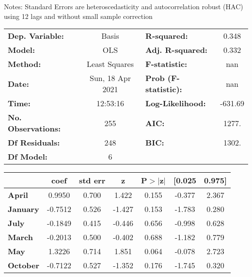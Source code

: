 Notes: \newline
 [1] Standard Errors are heteroscedasticity and autocorrelation robust (HAC) using 12 lags and without small sample correction
\begin{center}
\begin{tabular}{lclc}
\toprule
\textbf{Dep. Variable:}    &      Basis       & \textbf{  R-squared:         } &     0.348   \\
\textbf{Model:}            &       OLS        & \textbf{  Adj. R-squared:    } &     0.332   \\
\textbf{Method:}           &  Least Squares   & \textbf{  F-statistic:       } &       nan   \\
\textbf{Date:}             & Sun, 18 Apr 2021 & \textbf{  Prob (F-statistic):} &      nan    \\
\textbf{Time:}             &     12:53:16     & \textbf{  Log-Likelihood:    } &   -631.69   \\
\textbf{No. Observations:} &         255      & \textbf{  AIC:               } &     1277.   \\
\textbf{Df Residuals:}     &         248      & \textbf{  BIC:               } &     1302.   \\
\textbf{Df Model:}         &           6      & \textbf{                     } &             \\
\bottomrule
\end{tabular}
\begin{tabular}{lcccccc}
                 & \textbf{coef} & \textbf{std err} & \textbf{z} & \textbf{P$> |$z$|$} & \textbf{[0.025} & \textbf{0.975]}  \\
\midrule
\textbf{April}   &       0.9950  &        0.700     &     1.422  &         0.155        &       -0.377    &        2.367     \\
\textbf{January} &      -0.7512  &        0.526     &    -1.427  &         0.153        &       -1.783    &        0.280     \\
\textbf{July}    &      -0.1849  &        0.415     &    -0.446  &         0.656        &       -0.998    &        0.628     \\
\textbf{March}   &      -0.2013  &        0.500     &    -0.402  &         0.688        &       -1.182    &        0.779     \\
\textbf{May}     &       1.3226  &        0.714     &     1.851  &         0.064        &       -0.078    &        2.723     \\
\textbf{October} &      -0.7122  &        0.527     &    -1.352  &         0.176        &       -1.745    &        0.320     \\

\end{tabular}
\end{center}
